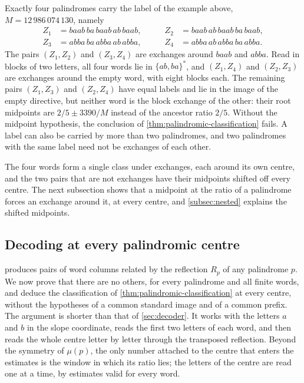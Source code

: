 \begin{remark}
\label{rem:quadruple}
Exactly four palindromes carry the label of the example above,
$M=12\,986\,074\,130$, namely
$$
 \begin{aligned}
 Z_1&=baab\,ba\,baab\,ab\,baab, &\qquad Z_2&=baab\,ab\,baab\,ba\,baab,\\
 Z_3&=abba\,ba\,abba\,ab\,abba, &\qquad Z_4&=abba\,ab\,abba\,ba\,abba.
 \end{aligned}
$$
The pairs $(Z_1,Z_2)$ and $(Z_3,Z_4)$ are exchanges around $baab$ and $abba$. Read in blocks of
two letters, all four words lie in $\{ab,ba\}^*$, and $(Z_1,Z_4)$ and $(Z_2,Z_3)$ are exchanges
around the empty word, with eight blocks each. The remaining pairs $(Z_1,Z_3)$ and $(Z_2,Z_4)$
have equal labels and lie in the image of the empty directive, but neither word is the block
exchange of the other: their root midpoints are $2/5\pm3390/M$ instead of the ancestor
ratio $2/5$. Without the midpoint hypothesis, the conclusion of
\cref{thm:palindromic-classification} fails. A label can also be carried by more than two
palindromes, and two palindromes with the same label need not be exchanges of each other.
\end{remark}

The four words form a single class under exchanges, each around its own centre, and the two
pairs that are not exchanges have their midpoints shifted off every centre. The next subsection
shows that a midpoint at the ratio of a palindrome forces an exchange around it, at every centre,
and \cref{subsec:nested} explains the shifted midpoints.

\subsection{Decoding at every palindromic centre}
\label{subsec:centre-decoder}

 produces pairs of word columns related by the reflection $R_p$ of any
palindrome $p$. We now prove that there are no others, for every palindrome and all finite words,
and deduce the classification of \cref{thm:palindromic-classification} at every centre, without
the hypotheses of a common standard image and of a common prefix. The argument is shorter than that
of \cref{sec:decoder}. It works with the letters $a$ and $b$ in the slope coordinate, reads the
first two letters of each word, and then reads the whole centre letter by letter through the
transposed reflection. Beyond the symmetry of $\mu(p)$, the only number attached to the centre
that enters the estimates is the window in which its ratio lies; the letters of the centre are read
one at a time, by estimates valid for every word.

